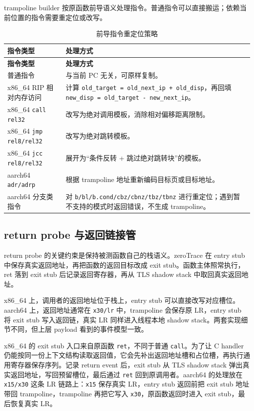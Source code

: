\documentclass[UTF8,a4paper,11pt,fontset=fandol]{ctexart}
\newcommand{\code}[1]{\texttt{#1}}
\begin{document}
trampoline builder 按原函数前导语义处理指令。普通指令可以直接搬运；依赖当前位置的指令需要重定位或改写。

\begin{longtable}{@{}P{3.3cm}P{12.25cm}@{}}
\caption{前导指令重定位策略}\label{tab:relocation}\\
\toprule
\textbf{指令类型} & \textbf{处理方式}\\
\midrule
\endfirsthead
\toprule
\textbf{指令类型} & \textbf{处理方式}\\
\midrule
\endhead
普通指令 & 与当前 PC 无关，可原样复制。\\
x86\_64 RIP 相对内存访问 & 计算 \code{old\_target = old\_next\_ip + old\_disp}，再回填 \code{new\_disp = old\_target - new\_next\_ip}。\\
x86\_64 \code{call rel32} & 改写为绝对调用模板，消除相对偏移距离限制。\\
x86\_64 \code{jmp rel8/rel32} & 改写为绝对跳转模板。\\
x86\_64 \code{jcc rel8/rel32} & 展开为“条件反转 + 跳过绝对跳转块”的模板。\\
aarch64 \code{adr/adrp} & 根据 trampoline 地址重新编码目标页或目标地址。\\
aarch64 分支类指令 & 对 \code{b/bl/b.cond/cbz/cbnz/tbz/tbnz} 进行重定位；遇到暂不支持的模式时返回错误，不生成 trampoline。\\
\bottomrule
\end{longtable}

\subsection{return probe 与返回链接管}

return probe 的关键约束是保持被测函数自己的栈语义。zeroTrace 在 entry stub 中保存真实返回地址，再把函数的返回目标改成 exit stub。函数主体照常执行，ret 落到 exit stub 后记录返回寄存器，再从 TLS shadow stack 中取回真实返回地址。

x86\_64 上，调用者的返回地址位于栈上，entry stub 可以直接改写对应槽位。aarch64 上，返回地址通常在 \code{x30/lr} 中，trampoline 会保存原 LR，entry stub 将 exit stub 写入返回链，真实 LR 同样进入线程本地 shadow stack。两套实现细节不同，但上层 payload 看到的事件模型一致。

x86\_64 的 exit stub 入口来自原函数 \code{ret}，不同于普通 \code{call}。为了让 C handler 仍能按同一份上下文结构读取返回值，它会先补出返回地址槽和占位槽，再执行通用寄存器保存序列。记录 return event 后，exit stub 从 TLS shadow stack 弹出真实返回地址，写回预留槽位，最后通过 \code{ret} 回到原调用者。aarch64 的处理放在 \code{x15/x30} 这条 LR 链路上：\code{x15} 保存真实 LR，entry stub 返回前把 exit stub 地址带回 trampoline，trampoline 再把它写入 \code{x30}，原函数返回时进入 exit stub，最后恢复真实 LR。
\end{document}
